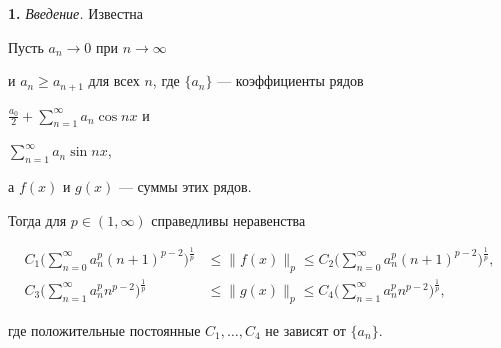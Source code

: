 \date{}




\pagestyle{plain} %







\maketitle


\label{begin}











{\bf 1.} {\it Введение.} Известна





\begin{hlt}


Пусть $a_n\to 0$ при $n\to \infty$


и $a_n\geq a_{n+1}$ для всех $n$, где $\{a_n\}$ --- коэффициенты рядов


$\frac{a_0}{2}+\sum\limits_{n=1}^{\infty}a_n\cos nx$  и


$\sum\limits_{n=1}^{\infty}a_n\sin nx$,


а $f(x)$ и $g(x)$ --- суммы этих рядов.


Тогда для $p\in (1,\infty)$ справедливы неравенства


\begin{align*}


C_1\bigg(\sum\limits_{n=0}^{\infty}a_n^p(n+1)^{p-2}\bigg)^{\frac{1}{p}}


&\leq \|f(x)\|_p \leq C_2 \bigg(\sum\limits_{n=0}^{\infty}


a_n^p(n+1)^{p-2}\bigg)^{\frac{1}{p}},\\


%


C_3\bigg(\sum\limits_{n=1}^{\infty}a_n^pn^{p-2}\bigg)^{\frac{1}{p}}


&\leq \|g(x)\|_p \leq C_4 \bigg(\sum\limits_{n=1}^{\infty}


a_n^pn^{p-2}\bigg)^{\frac{1}{p}},


\end{align*}


где положительные постоянные $C_1,\dotsc,C_4$ не зависят от $\{a_n\}$.


\end{hlt}





